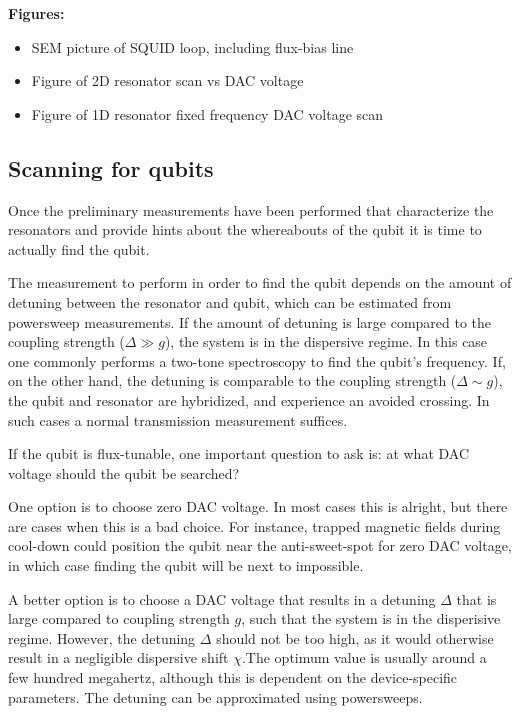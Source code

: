         \textbf{Figures:}
        \begin{itemize}
          \item SEM picture of SQUID loop, including flux-bias line
          \item Figure of 2D resonator scan vs DAC voltage
          \item Figure of 1D resonator fixed frequency DAC voltage scan
        \end{itemize}

      \subsection{Scanning for qubits}
        \label{sec:spectroscopy}
        Once the preliminary measurements have been performed that characterize the resonators and provide hints about the whereabouts of the qubit it is time to actually find the qubit.

        The measurement to perform in order to find the qubit depends on the amount of detuning between the resonator and qubit, which can be estimated from powersweep measurements. If the amount of detuning is large compared to the coupling strength ($\Delta \gg  g$), the system is in the dispersive regime. In this case one commonly performs a two-tone spectroscopy to find the qubit's frequency. If, on the other hand, the detuning is comparable to the coupling strength ($\Delta \sim g$), the qubit and resonator are hybridized, and experience an avoided crossing. In such cases a normal transmission measurement suffices.

        If the qubit is flux-tunable, one important question to ask is: at what DAC voltage should the qubit be searched?

        One option is to choose zero DAC voltage. In most cases this is alright, but there are cases when this is a bad choice. For instance, trapped magnetic fields during cool-down could position the qubit near the anti-sweet-spot for zero DAC voltage, in which case finding the qubit will be next to impossible.

        A better option is to choose a DAC voltage that results in a detuning $\Delta$ that is large compared to coupling strength $g$, such that the system is in the disperisive regime. However, the detuning $\Delta$ should not be too high, as it would otherwise result in a negligible dispersive shift $\chi$.The optimum value is usually around a few hundred megahertz, although this is dependent on the device-specific parameters. The detuning can be approximated using powersweeps.

